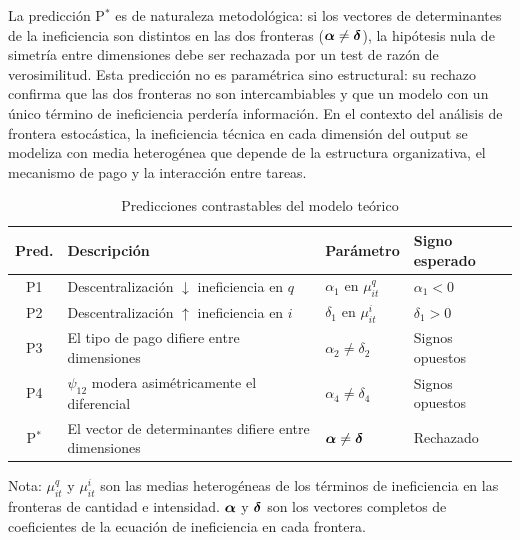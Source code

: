 La predicción P$^*$ es de naturaleza metodológica: si los vectores de determinantes de la ineficiencia son distintos en las dos fronteras ($\boldsymbol{\alpha}\neq\boldsymbol{\delta}$), la hipótesis nula de simetría entre dimensiones debe ser rechazada por un test de razón de verosimilitud. Esta predicción no es paramétrica sino estructural: su rechazo confirma que las dos fronteras no son intercambiables y que un modelo con un único término de ineficiencia perdería información. En el contexto del análisis de frontera estocástica, la ineficiencia técnica en cada dimensión del output se modeliza con media heterogénea que depende de la estructura organizativa, el mecanismo de pago y la interacción entre tareas.

\begin{table}[htbp]
\centering
\caption{Predicciones contrastables del modelo teórico}
\label{tab:predicciones}
\begin{threeparttable}
\begin{tabularx}{\linewidth}{cXp{3cm}p{2.5cm}}
\toprule
\textbf{Pred.} & \textbf{Descripción} &
\textbf{Parámetro} & \textbf{Signo esperado} \\
\midrule
P1 & Descentralización $\downarrow$ ineficiencia en $q$
   & $\alpha_1$ en $\mu^q_{it}$ & $\alpha_1 < 0$ \\[3pt]
P2 & Descentralización $\uparrow$ ineficiencia en $i$
   & $\delta_1$ en $\mu^i_{it}$ & $\delta_1 > 0$ \\[3pt]
P3 & El tipo de pago difiere entre dimensiones
   & $\alpha_2 \neq \delta_2$ & Signos opuestos \\[3pt]
P4 & $\psi_{12}$ modera asimétricamente el diferencial
   & $\alpha_4 \neq \delta_4$ & Signos opuestos \\[3pt]
P$^*$ & El vector de determinantes difiere entre
         dimensiones & $\boldsymbol{\alpha} \neq \boldsymbol{\delta}$
       & Rechazado \\
\bottomrule
\end{tabularx}
\begin{tablenotes}
  \small
  \item Nota: $\mu^q_{it}$ y $\mu^i_{it}$ son las medias heterogéneas de los términos de ineficiencia en las fronteras de cantidad e intensidad. $\boldsymbol{\alpha}$ y $\boldsymbol{\delta}$ son los vectores completos de coeficientes de la ecuación de ineficiencia en cada frontera.
\end{tablenotes}
\end{threeparttable}
\end{table}

